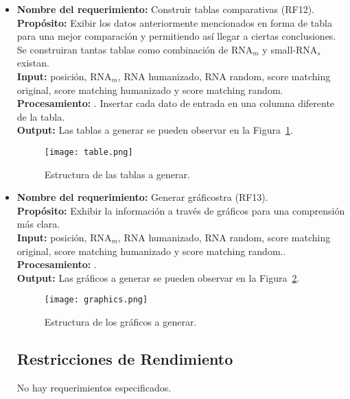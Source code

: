 \documentclass[12pt,a4paper,spanish]{article}
\begin{document}
\begin{itemize}
		\item \textbf{Nombre del requerimiento:} Construir tablas comparativas (RF12).\\
 	    \textbf{Propósito:} Exibir los datos anteriormente mencionados en forma de tabla para una mejor comparación y permitiendo así llegar a 								ciertas conclusiones. Se construiran tantas tablas como combinación de RNA$_m$ y small-RNA$_s$ existan.\\
		\textbf{Input:} posición, RNA$_m$, RNA humanizado, RNA random, score matching original, score matching humanizado y score matching random.\\
		\textbf{Procesamiento:} . Insertar cada dato de entrada en una columna diferente de la tabla.\\
		\textbf{Output:} Las tablas a generar se pueden observar en la Figura~\ref{table}.
			\vskip 0.5cm
			\begin{figure}[h]
				\begin{center}
					\texttt{[image: table.png]}
					\caption{Estructura de las tablas a generar.}
					\label{table}
				\end{center}
			\end{figure}
		
		\item \textbf{Nombre del requerimiento:} Generar gráficostra (RF13).\\
 	    \textbf{Propósito:} Exhibir la información a través de gráficos para una comprensión más clara.\\
		\textbf{Input:} posición, RNA$_m$, RNA humanizado, RNA random, score matching original, score matching humanizado y score matching random..\\
		\textbf{Procesamiento:} .\\
		\textbf{Output:} Las gráficos a generar se pueden observar en la Figura~\ref{graphic}.
			\begin{figure}[h]
				\begin{center}
					\texttt{[image: graphics.png]}
					\caption{Estructura de los gráficos a generar.}
					\label{graphic}
				\end{center}
			\end{figure}

\subsection{Restricciones de Rendimiento}
No hay requerimientos especificados.


\end{itemize}
\end{document}
